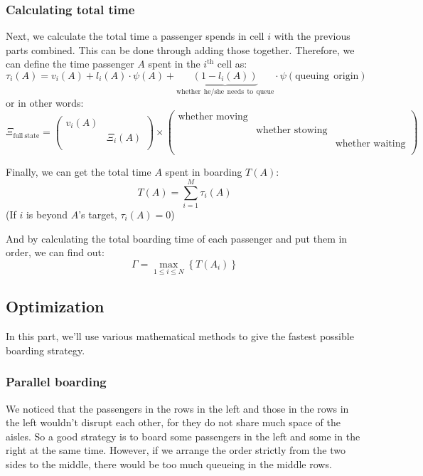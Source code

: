 \documentclass{article}
\theoremstyle{definition}
\theoremstyle{remark}
\numberwithin{equation}{section}
\begin{document}
	\subsubsection{Calculating total time}
	Next, we calculate the total time a passenger spends in cell \(i\) with the previous parts combined. This can be done through adding those together. Therefore, we can define the time passenger $A$ spent in the $i^\text{th}$ cell as:
	$$\tau _i\left( A \right) =v_i\left( A \right) +l_i\left( A \right) \cdot \psi \left( A \right) +\underset{\mathrm{whether}\:\:\mathrm{he}/\mathrm{she}\:\:\mathrm{needs}\:\:\mathrm{to}\:\:\mathrm{queue}}{\underbrace{\left( 1-l_i\left( A \right) \right) }}\cdot \psi \left( \mathrm{queuing}\:\:\mathrm{origin} \right)$$
	or in other words:
	\[\Xi _{\mathrm{full}\:\mathrm{state}}=\left( \begin{matrix}
	v_i\left( A \right)&		\\
	&		\Xi _i\left( A \right)\\
	\end{matrix} \right) \times \left( \begin{matrix}
	\text{whether moving}&		&		\\
	&		\text{whether stowing}&		\\
	&		&		\text{whether waiting}\\
	\end{matrix} \right) \]

	Finally, we can get the total time $A$ spent in boarding $T(A)$:
	$$T\left( A \right) =\sum_{i=1}^M{\tau _i\left( A \right)}$$
	(If $i$ is beyond \(A\)'s target, $\tau_i(A)=0$)

	And by calculating the total boarding time of each passenger and put them in order, we can find out:
	$$\Gamma =\max_{1\le i\le N} \left\{ T\left( A_i \right) \right\}$$
	\subsection{Optimization}
	In this part, we'll use various mathematical methods to give the fastest possible boarding strategy.
	\subsubsection{Parallel boarding}
	We noticed that the passengers in the rows in the left and those in the rows in the left wouldn't disrupt each other, for they do not share much space of the aisles. So a good strategy is to board some passengers in the left and some in the right at the same time. However, if we arrange the order strictly from the two sides to the middle, there would be too much queueing in the middle rows.
\end{document}
